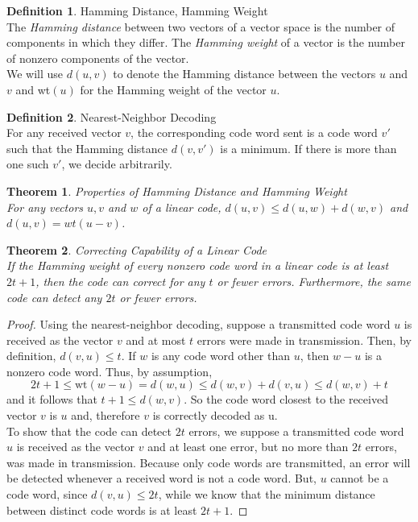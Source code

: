 \documentclass{article}
\newtheorem{theorem}{Theorem}
\theoremstyle{definition}
\newtheorem{definition}{Definition}
\begin{document}
\begin{definition}{Hamming Distance, Hamming Weight}\\The \textit{Hamming distance} between two vectors of a vector space is the number of components in which they differ. The \textit{Hamming weight} of a vector is the number of nonzero components of the vector.\\ We will use $d(u,v)$ to denote the Hamming distance between the vectors $u$ and $v$ and wt$(u)$ for the Hamming weight of the vector $u$.
\end{definition}

\begin{definition}{Nearest-Neighbor Decoding}\\
  For any received vector $v$, the corresponding code word sent is a code word $v'$ such that the Hamming distance $d(v,v')$ is a minimum. If there is more than one such $v'$, we decide arbitrarily.
\end{definition}

\begin{theorem}{Properties of Hamming Distance and Hamming Weight}\\
For any vectors $u,v$ and $w$ of a linear code, $d(u,v)\leq d(u,w)+d(w,v)$ and $d(u,v)=wt(u-v)$.
\end{theorem}

\begin{theorem}{Correcting Capability of a Linear Code}\\
If the Hamming weight of every nonzero code word in a linear code is at least $2t+1$, then the code can correct for any $t$ or fewer errors. Furthermore, the same code can detect any $2t$ or fewer errors.
\end{theorem}
\begin{proof}
  Using the nearest-neighbor decoding, suppose a transmitted code word $u$ is received as the vector $v$ and at most $t$ errors were made in transmission. Then, by definition, $d(v,u)\leq t$. If $w$ is any code word other than $u$, then $w-u$ is a nonzero code word. Thus, by assumption,
  \[2t+1 \leq \text{wt}(w-u) = d(w,u) \leq d(w,v) + d(v,u) \leq d(w,v) + t\]
  and it follows that $t+1 \leq d(w,v).$ So the code word closest to the received vector $v$ is $u$ and, therefore $v$ is correctly decoded as u.\\
  To show that the code can detect $2t$ errors, we suppose a transmitted code word $u$ is received as the vector $v$ and at least one error, but no more than $2t$ errors, was made in transmission. Because only code words are transmitted, an error will be detected whenever a received word is not a code word. But, $u$ cannot be a code word, since $d(v,u) \leq 2t$, while we know that the minimum distance between distinct code words is at least $2t+1$.
\end{proof}
\end{document}
